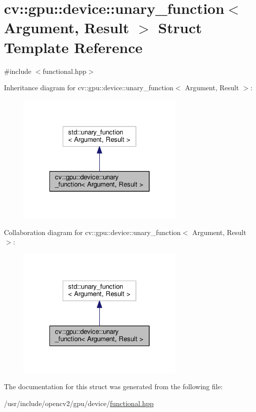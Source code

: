 \hypertarget{structcv_1_1gpu_1_1device_1_1unary__function}{\section{cv\-:\-:gpu\-:\-:device\-:\-:unary\-\_\-function$<$ Argument, Result $>$ Struct Template Reference}
\label{structcv_1_1gpu_1_1device_1_1unary__function}
}


{\ttfamily \#include $<$functional.\-hpp$>$}



Inheritance diagram for cv\-:\-:gpu\-:\-:device\-:\-:unary\-\_\-function$<$ Argument, Result $>$\-:\nopagebreak
\begin{figure}[H]
\begin{center}
\leavevmode
\includegraphics[width=230pt]{structcv_1_1gpu_1_1device_1_1unary__function__inherit__graph}
\end{center}
\end{figure}


Collaboration diagram for cv\-:\-:gpu\-:\-:device\-:\-:unary\-\_\-function$<$ Argument, Result $>$\-:\nopagebreak
\begin{figure}[H]
\begin{center}
\leavevmode
\includegraphics[width=230pt]{structcv_1_1gpu_1_1device_1_1unary__function__coll__graph}
\end{center}
\end{figure}


The documentation for this struct was generated from the following file\-:\begin{DoxyCompactItemize}
\item 
/usr/include/opencv2/gpu/device/\hyperlink{functional_8hpp}{functional.\-hpp}\end{DoxyCompactItemize}
